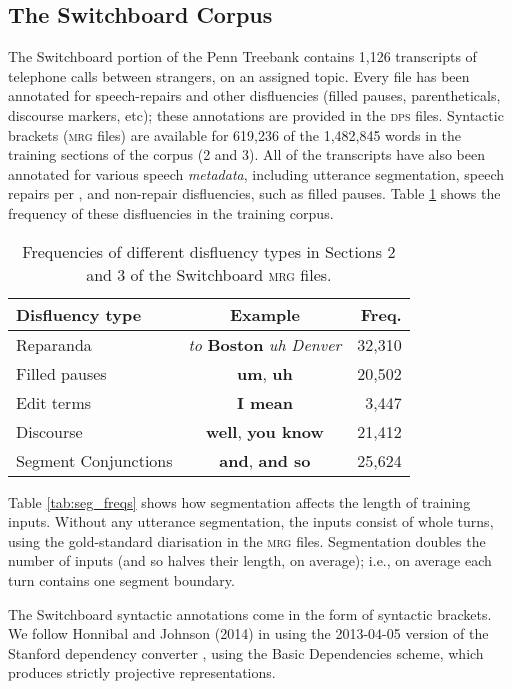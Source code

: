 \documentclass[11pt,letterpaper]{article}
\begin{document}
\newpage
\subsection{The Switchboard Corpus}
\label{sec:swbd}

The Switchboard portion of the Penn Treebank \citep{marcus:93} contains 1,126
transcripts of telephone calls between strangers, on an assigned topic.
Every file has been annotated for speech-repairs and other disfluencies (filled
pauses, parentheticals, discourse markers, etc); these annotations are provided
in the \textsc{dps} files.  Syntactic brackets (\textsc{mrg} files) are available
for 619,236 of the 1,482,845 words in the training sections of the corpus (2 and 3). 
All of the transcripts have also been annotated for various speech \emph{metadata},
including utterance segmentation, speech repairs per \citet{shriberg:94}, and 
non-repair disfluencies, such as filled pauses.  Table \ref{tab:dfl_freqs} shows the
frequency of these disfluencies in the training corpus.

\begin{table}
    \centering
    \small
    \begin{tabular}{lc|r}
\hline
Disfluency type & Example & Freq. \\
\hline \hline
Reparanda & \emph{to } \textbf{Boston} \emph{uh Denver} & 32,310 \\
Filled pauses    & \textbf{um}, \textbf{uh} & 20,502 \\
Edit terms & \textbf{I mean} & 3,447 \\ 
Discourse  & \textbf{well}, \textbf{you know} & 21,412  \\
Segment Conjunctions & \textbf{and}, \textbf{and so} & 25,624 \\
\hline
\end{tabular}
\caption{\small Frequencies of different disfluency types in Sections 2 and 3 of the
Switchboard \textsc{mrg} files.\label{tab:dfl_freqs}}
\vspace*{-0.5in}
\end{table}

Table \ref{tab:seg_freqs} shows how segmentation affects the length of training
inputs.  Without any utterance segmentation, the inputs consist of whole turns,
using the gold-standard diarisation in the \textsc{mrg} files.
Segmentation doubles the number of inputs (and so halves their length, on average);
i.e., on average each turn contains one segment boundary.

The Switchboard syntactic annotations come in the form of syntactic brackets.
We follow Honnibal and Johnson (2014) in using
the 2013-04-05 version of the Stanford dependency converter \citep{stanford_deps},
using the Basic Dependencies scheme,
which produces strictly projective representations.
\end{document}
